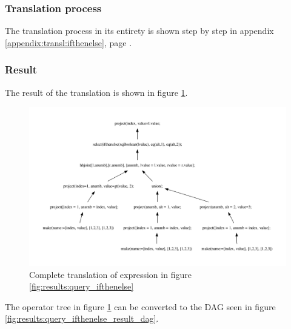 \subsubsection{Translation process}
The translation process in its entirety is shown step by step in appendix
\ref{appendix:transl:ifthenelse}, page \pageref{appendix:transl:ifthenelse}.

\subsubsection{Result}
The result of the translation is shown in figure
\ref{fig:results:query_ifthenelse_result}.

\begin{figure}[!htp]
\begin{center}
  \includegraphics[width=1.0\textwidth]{img/graphs/ifthenelse}
  \caption{Complete translation of expression in figure
  \ref{fig:results:query_ifthenelse}}
  \label{fig:results:query_ifthenelse_result}
\end{center}
\end{figure}

The operator tree in figure \ref{fig:results:query_ifthenelse_result} can be
converted to the DAG seen in figure \ref{fig:results:query_ifthenelse_result_dag}.

\newpage

